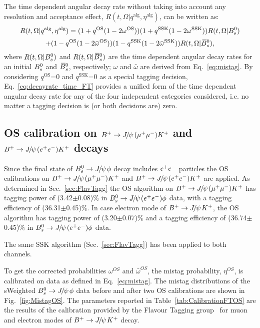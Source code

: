The time dependent angular decay rate without taking into account any resolution and acceptance effect, $R(t, \Omega|q^{\text{alg}}, \eta^{\text{alg}})$, can be written as:
\[
 R(t, \Omega|q^{\text{alg}}, \eta^{\text{alg}})=(1+q^{\text{OS}}(1-2\omega^{\text{OS}}))(1+q^{\text{SSK}}(1-2\omega^{\text{SSK}}))R(t,\Omega|{{B}^0_{s}})
\]
\begin{equation}\label{eq:decayrate_time_FT}
   +(1-q^{\text{OS}}(1-2\bar{\omega}^{\text{OS}}))(1-q^{\text{SSK}}(1-2\bar{\omega}^{\text{SSK}}))R(t,\Omega|{{\kern 0.18em\overline{\kern -0.18em B}{}}{}^0_{s}}),
\end{equation}
where $R(t,\Omega|{{B}^0_{s}})$ and $R(t,\Omega|{{\kern 0.18em\overline{\kern -0.18em B}{}}{}^0_{s}})$ are the time dependent angular decay rates for an initial ${{B}^0_{s}}$ and ${{\kern 0.18em\overline{\kern -0.18em B}{}}{}^0_{s}}$, respectively; $\omega$ and $\bar{\omega}$ are derived from Eq.~\ref{eq:mistag}. By considering $q^{\text{OS}}$=0 and $q^{\text{SSK}}$=0 as a special tagging decision, Eq.~\ref{eq:decayrate_time_FT} provides a unified form of the time dependent angular decay rate for any of the four independent categories considered, i.e. no matter a tagging decision is (or both decisions are) zero. 

\subsection{OS calibration on ${{{B}^+}}\rightarrow{\ensuremath{{J\mskip -3mu/\mskip -2mu\psi\mskip 2mu}}}({\mu^+\mu^-}){{K}^+}$ and ${{{B}^+}}\rightarrow{\ensuremath{{J\mskip -3mu/\mskip -2mu\psi\mskip 2mu}}}({e^+e^-}){{K}^+}$ decays}

Since the final state of ${{B}^0_{s}}\rightarrow{\ensuremath{{J\mskip -3mu/\mskip -2mu\psi\mskip 2mu}}}\phi$ decay includes ${e^+e^-}$ particles the OS calibrations on ${{{B}^+}}\rightarrow{\ensuremath{{J\mskip -3mu/\mskip -2mu\psi\mskip 2mu}}}({\mu^+\mu^-}){{K}^+}$ and ${{{B}^+}}\rightarrow{\ensuremath{{J\mskip -3mu/\mskip -2mu\psi\mskip 2mu}}}({e^+e^-}){{K}^+}$ are applied. As determined in Sec.~\ref{sec:FlavTagg} the OS algorithm on ${{{B}^+}}\rightarrow{\ensuremath{{J\mskip -3mu/\mskip -2mu\psi\mskip 2mu}}}({\mu^+\mu^-}){{K}^+}$ has tagging power of (3.42$\pm$0.08)$\%$ in ${{B}^0_{s}}\rightarrow{\ensuremath{{J\mskip -3mu/\mskip -2mu\psi\mskip 2mu}}}({e^+e^-})\phi$ data, with a tagging efficiency of (36.31$\pm$0.45)$\%$. In case electron mode of ${{{B}^+}}\rightarrow{\ensuremath{{J\mskip -3mu/\mskip -2mu\psi\mskip 2mu}}}{\ensuremath{{K}^+}}$, the OS algorithm has tagging power of (3.20$\pm$0.07)$\%$ and a tagging efficiency of (36.74$\pm$0.45)$\%$ in ${{B}^0_{s}}\rightarrow{\ensuremath{{J\mskip -3mu/\mskip -2mu\psi\mskip 2mu}}}({e^+e^-})\phi$ data. 

The same SSK algorithm (Sec.~\ref{sec:FlavTagg}) has been applied to both channels.

To get the corrected probabilities $\omega^{OS}$ and $\bar{\omega}^{OS}$, the mistag probability, $\eta^{OS}$, is calibrated on data as defined in Eq.~\ref{eq:mistag}. The mistag distributions of the sWeighted ${{B}^0_{s}}\rightarrow{\ensuremath{{J\mskip -3mu/\mskip -2mu\psi\mskip 2mu}}}\phi$ data before and after two OS calibrations are shown in Fig.~\ref{fig:MistagOS}. The parameters reported in Table~\ref{tab:CalibrationFTOS} are the results of the calibration provided by the Flavour Tagging group~\cite{LHCb:FTa, LHCb:FTc} for muon and electron modes of ${{{B}^+}}\rightarrow{\ensuremath{{J\mskip -3mu/\mskip -2mu\psi\mskip 2mu}}}{\ensuremath{{K}^+}}$ decay. 

